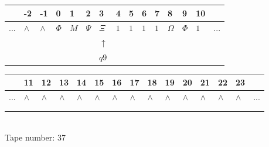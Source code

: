 \documentclass[11pt]{article}
\begin{document}
\begin{table}[H]
\centering
\begin{tabular}{lllllllllllllll}
 & -2 & -1 & 0 & 1 & 2 & 3 & 4 & 5 & 6 & 7 & 8 & 9 & 10 & \\
\hline
$...$ & \multicolumn{1}{|l|}{$\wedge$} & \multicolumn{1}{|l|}{$\wedge$} & \multicolumn{1}{|l|}{$\Phi$} & \multicolumn{1}{|l|}{$M$} & \multicolumn{1}{|l|}{$\Psi$} & \multicolumn{1}{|l|}{$\Xi$} & \multicolumn{1}{|l|}{$1$} & \multicolumn{1}{|l|}{$1$} & \multicolumn{1}{|l|}{$1$} & \multicolumn{1}{|l|}{$1$} & \multicolumn{1}{|l|}{$\Omega$} & \multicolumn{1}{|l|}{$\Phi$} & \multicolumn{1}{|l|}{$1$} & $...$\\
\hline
&  &  &  &  &  & $\uparrow$ &  &  &  &  &  &  &  &  \\
&  &  &  &  &  & $ q9 $ &  &  &  &  &  &  &  &  \\
\end{tabular}
\begin{tabular}{lllllllllllllll}
 & 11 & 12 & 13 & 14 & 15 & 16 & 17 & 18 & 19 & 20 & 21 & 22 & 23 & \\
\hline
$...$ & \multicolumn{1}{|l|}{$\wedge$} & \multicolumn{1}{|l|}{$\wedge$} & \multicolumn{1}{|l|}{$\wedge$} & \multicolumn{1}{|l|}{$\wedge$} & \multicolumn{1}{|l|}{$\wedge$} & \multicolumn{1}{|l|}{$\wedge$} & \multicolumn{1}{|l|}{$\wedge$} & \multicolumn{1}{|l|}{$\wedge$} & \multicolumn{1}{|l|}{$\wedge$} & \multicolumn{1}{|l|}{$\wedge$} & \multicolumn{1}{|l|}{$\wedge$} & \multicolumn{1}{|l|}{$\wedge$} & \multicolumn{1}{|l|}{$\wedge$} & $...$\\
\hline
&  &  &  &  &  &  &  &  &  &  &  &  &  &  \\
&  &  &  &  &  &  &  &  &  &  &  &  &  &  \\
\end{tabular}
\\
Tape number: 37
\noindent\makebox[\linewidth]{\hdashrule{\textwidth}{1pt}{1pt}}\end{table}
\end{document}
